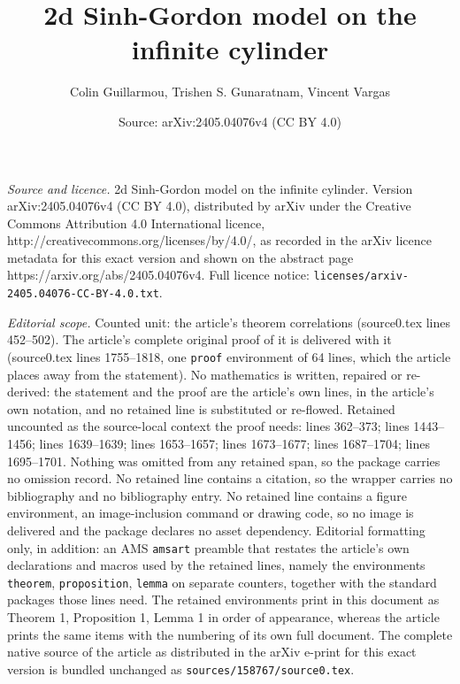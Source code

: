 \documentclass[10pt,a4paper]{amsart}
\title{2d Sinh-Gordon model on the infinite cylinder}
\author{Colin Guillarmou, Trishen S. Gunaratnam, Vincent Vargas}
\date{Source: arXiv:2405.04076v4 (CC BY 4.0)}
\begin{document}
\maketitle

\noindent\emph{Source and licence.} 2d Sinh-Gordon model on the infinite cylinder. Version arXiv:2405.04076v4 (CC BY 4.0), distributed by arXiv under the Creative Commons Attribution 4.0 International licence, http://creativecommons.org/licenses/by/4.0/, as recorded in the arXiv licence metadata for this exact version and shown on the abstract page https://arxiv.org/abs/2405.04076v4. Full licence notice: \texttt{licenses/arxiv-2405.04076-CC-BY-4.0.txt}.\par\smallskip

\noindent\textit{Editorial scope.} Counted unit: the article's theorem correlations (source0.tex lines 452--502). The article's complete original proof of it is delivered with it (source0.tex lines 1755--1818, one \texttt{proof} environment of 64 lines, which the article places away from the statement). No mathematics is written, repaired or re-derived: the statement and the proof are the article's own lines, in the article's own notation, and no retained line is substituted or re-flowed.  Retained uncounted as the source-local context the proof needs: lines 362--373; lines 1443--1456; lines 1639--1639; lines 1653--1657; lines 1673--1677; lines 1687--1704; lines 1695--1701.  Nothing was omitted from any retained span, so the package carries no omission record.  No retained line contains a citation, so the wrapper carries no bibliography and no bibliography entry.  No retained line contains a figure environment, an image-inclusion command or drawing code, so no image is delivered and the package declares no asset dependency.  Editorial formatting only, in addition: an AMS \texttt{amsart} preamble that restates the article's own declarations and macros used by the retained lines, namely the environments \texttt{theorem}, \texttt{proposition}, \texttt{lemma} on separate counters, together with the standard packages those lines need.  The retained environments print in this document as Theorem 1, Proposition 1, Lemma 1 in order of appearance, whereas the article prints the same items with the numbering of its own full document.  The complete native source of the article as distributed in the arXiv e-print for this exact version is bundled unchanged as \texttt{sources/158767/source0.tex}.
\end{document}
